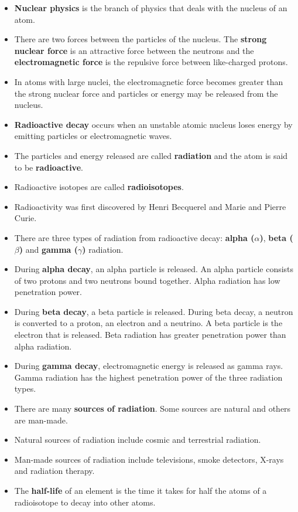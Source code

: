 \begin{itemize}
\item{\textbf{Nuclear physics} is the branch of physics that deals with the nucleus of an atom.}
\item{There are two forces between the particles of the nucleus. The \textbf{strong nuclear force} is an attractive force between the neutrons and the \textbf{electromagnetic force} is the repulsive force between like-charged protons.}
\item{In atoms with large nuclei, the electromagnetic force becomes greater than the strong nuclear force and particles or energy may be released from the nucleus.}
\item{\textbf{Radioactive decay} occurs when an unstable atomic nucleus loses energy by emitting particles or electromagnetic waves.}
\item{The particles and energy released are called \textbf{radiation} and the atom is said to be \textbf{radioactive}.}
\item{Radioactive isotopes are called \textbf{radioisotopes}.}
\item{Radioactivity was first discovered by Henri Becquerel and Marie and Pierre Curie.}
\item{There are three types of radiation from radioactive decay: \textbf{alpha ($\alpha$)}, \textbf{beta ($\beta$)} and \textbf{gamma ($\gamma$)} radiation.}
\item{During \textbf{alpha decay}, an alpha particle is released. An alpha particle consists of two protons and two neutrons bound together. Alpha radiation has low penetration power.}
\item{During \textbf{beta decay}, a beta particle is released. During beta decay, a neutron is converted to a proton, an electron and a neutrino. A beta particle is the electron that is released. Beta radiation has greater penetration power than alpha radiation.}
\item{During \textbf{gamma decay}, electromagnetic energy is released as gamma rays. Gamma radiation has the highest penetration power of the three radiation types.}
\item{There are many \textbf{sources of radiation}. Some sources are natural and others are man-made.}
\item{Natural sources of radiation include cosmic and terrestrial radiation.}
\item{Man-made sources of radiation include televisions, smoke detectors, X-rays and radiation therapy.}
\item{The \textbf{half-life} of an element is the time it takes for half the atoms of a radioisotope to decay into other atoms.}

\end{itemize}
